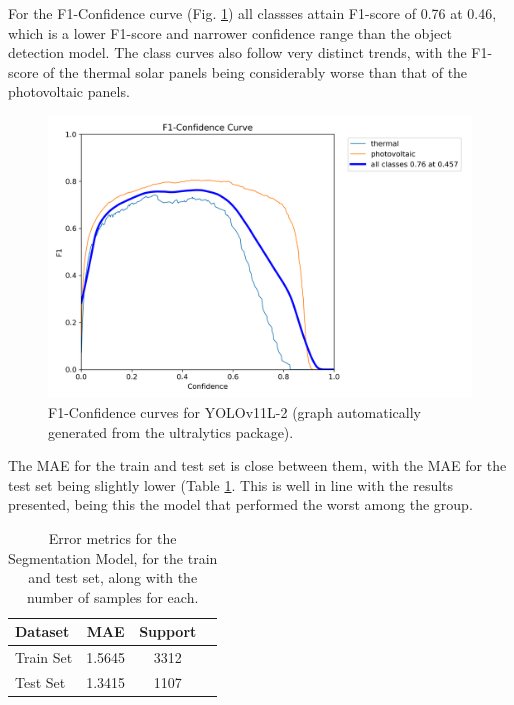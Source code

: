 \documentclass[conference]{IEEEtran}
\begin{document}
For the F1-Confidence curve (Fig. \ref{fig:model02_yolof1}) all classses attain F1-score of 0.76 at 0.46, which is a lower F1-score and narrower confidence range than the object detection model. The class curves also follow very distinct trends, with the F1-score of the thermal solar panels being considerably worse than that of the photovoltaic panels.

\begin{figure}[H]
    \centering
    \includegraphics[width=1\linewidth]{assets/model02_yolof1.png}
    \caption{F1-Confidence curves for YOLOv11L-2 (graph automatically generated from the ultralytics package).}
    \label{fig:model02_yolof1}
\end{figure}

The MAE for the train and test set is close between them, with the MAE for the test set being slightly lower (Table \ref{tab:model02_results}. This is well in line with the results presented, being this the model that performed the worst among the group.

\begin{table}[H]
\centering
\caption{Error metrics for the Segmentation Model, for the train and test set, along with the number of samples for each.}
\label{tab:model02_results}
\begin{tabular}{lccc}
\toprule
\textbf{Dataset} & \textbf{MAE} & \textbf{Support} \\
\midrule
Train Set & 1.5645 & 3312 \\
Test Set & 1.3415 & 1107 \\
\bottomrule
\end{tabular}
\end{table}


\newpage
\end{document}
